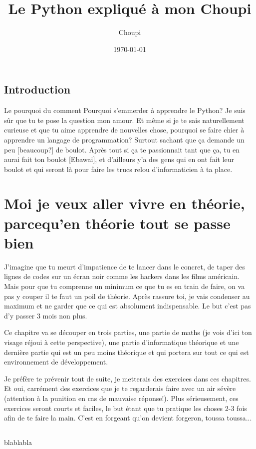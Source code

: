 \documentclass[a4paper, 11pt, oneside, draft]{book}
\title{Le Python expliqué à mon Choupi}
\author{Choupi}
\date{\today}
\begin{document}
\maketitle

\frontmatter
\chapter{Introduction}{Le pourquoi du comment}
Pourquoi s'emmerder à apprendre le Python? Je suis sûr que tu te pose la question mon amour.
Et même si je te sais naturellement curieuse et que tu aime apprendre de nouvelles chose, pourquoi
se faire chier à apprendre un langage de programmation? Surtout sachant que ça demande un peu
[beaucoup?] de boulot. Après tout si ça te passionnait tant que ça, tu en aurai fait ton boulot [Ebawai],
et d'ailleurs y'a des gens qui en ont fait leur boulot et qui seront là pour faire les trucs relou
d'informaticien à ta place.

\mainmatter

\part[Théorie]{Moi je veux aller vivre en théorie, parcequ'en théorie tout se passe bien}
J'imagine que tu meurt d'impatience de te lancer dans le concret, de taper des lignes de codes sur un écran noir comme les hackers
dans les films américain. Mais pour que tu comprenne un minimum ce que tu es en train de faire, on va pas y couper il te faut
un poil de théorie. Après rassure toi, je vais condenser au maximum et ne garder que ce qui est absolument indispensable. Le but
c'est pas d'y passer 3 mois non plus.

Ce chapitre va se découper en trois parties, une partie de maths (je vois d'ici ton visage réjoui à cette perspective), une partie
d'informatique théorique et une dernière partie qui est un peu moins théorique et qui portera sur tout ce qui est environnement
de développement.

Je préfère te prévenir tout de suite, je metterais des exercices dans ces chapitres. Et oui, carrément des exercices que je te regarderais
faire avec un air sévère (attention à la punition en cas de mauvaise réponse!). Plus sérieusement, ces exercices seront courts
et faciles, le but étant que tu pratique les choses 2-3 fois afin de te faire la main. C'est en forgeant qu'on devient forgeron, toussa toussa...


\chapter[Les Maths (avec un grand 'M')]{}
blablabla

\backmatter

\tableofcontents
\end{document}
